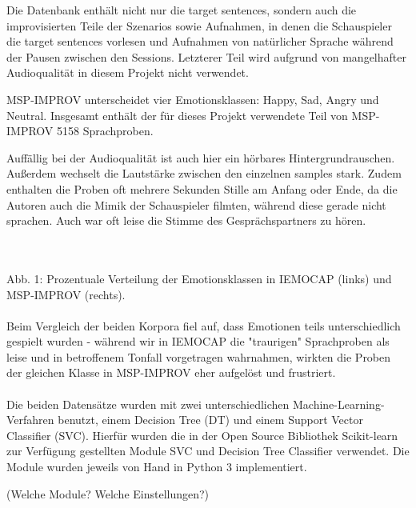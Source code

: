 \documentclass{article} %
\begin{document}
Die Datenbank enthält nicht nur die target sentences, sondern auch die improvisierten Teile der Szenarios sowie Aufnahmen, in denen die Schauspieler die target sentences vorlesen und Aufnahmen von natürlicher Sprache während der Pausen zwischen den Sessions. Letzterer Teil wird aufgrund von mangelhafter Audioqualität in diesem Projekt nicht verwendet. 

MSP-IMPROV unterscheidet vier Emotionsklassen: Happy, Sad, Angry und Neutral. Insgesamt enthält der für dieses Projekt verwendete Teil von MSP-IMPROV 5158 Sprachproben. 

Auffällig bei der Audioqualität ist auch hier ein hörbares Hintergrundrauschen. Außerdem wechselt die Lautstärke zwischen den einzelnen samples stark. Zudem enthalten die Proben oft mehrere Sekunden Stille am Anfang oder Ende, da die Autoren auch die Mimik der Schauspieler filmten, während diese gerade nicht sprachen. Auch war oft leise die Stimme des Gesprächspartners zu hören. \\ \\
 \\
Abb. 1: Prozentuale Verteilung der Emotionsklassen in IEMOCAP (links) und MSP-IMPROV (rechts). \\ \\
Beim Vergleich der beiden Korpora fiel auf, dass Emotionen teils unterschiedlich gespielt wurden - während wir in IEMOCAP die "traurigen" Sprachproben als leise und in betroffenem Tonfall vorgetragen wahrnahmen, wirkten die Proben der gleichen Klasse in MSP-IMPROV eher aufgelöst und frustriert. \\ \\
Die beiden Datensätze wurden mit zwei unterschiedlichen Machine-Learning-Verfahren benutzt, einem Decision Tree (DT) und einem Support Vector Classifier (SVC). Hierfür wurden die in der Open Source Bibliothek Scikit-learn zur Verfügung gestellten Module SVC und Decision Tree Classifier verwendet. Die Module wurden jeweils von Hand in Python 3 implementiert. 

(Welche Module? Welche Einstellungen?)
\end{document}
